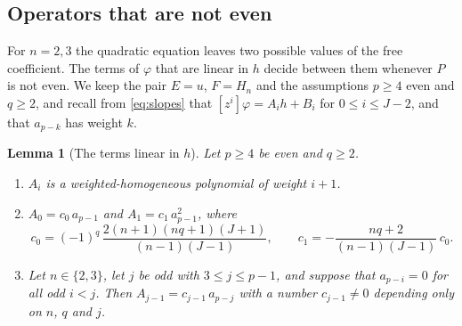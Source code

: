 \documentclass[11pt]{article}
\newtheorem{lemma}[theorem]{Lemma}
\theoremstyle{definition}
\theoremstyle{remark}
\numberwithin{equation}{section}
\begin{document}
\subsection{Operators that are not even}\label{sec:not-even}

For \(n=2,3\) the quadratic equation leaves two possible values of the
free coefficient. The terms of \(\varphi\) that are linear in \(h\)
decide between them whenever \(P\) is not even. We keep the pair
\(E=u\), \(F=H_n\) and the assumptions \(p\ge4\) even and \(q\ge2\), and
recall from \eqref{eq:slopes} that \([z^i]\varphi=A_ih+B_i\) for
\(0\le i\le J-2\), and that \(a_{p-k}\) has weight \(k\).

\begin{lemma}[The terms linear in \(h\)]\label{lem:slopes}
Let \(p\ge4\) be even and \(q\ge2\).
\begin{enumerate}[label=\textup{(\alph*)},leftmargin=2.2em]
\item \(A_i\) is a weighted-homogeneous polynomial of weight \(i+1\).
\item \(A_0=c_0\,a_{p-1}\) and \(A_1=c_1\,a_{p-1}^2\), where
\[
 c_0=(-1)^q\,\frac{2(n+1)(nq+1)(J+1)}{(n-1)(J-1)},\qquad
 c_1=-\frac{nq+2}{(n-1)(J-1)}\,c_0 .
\]
\item Let \(n\in\{2,3\}\), let \(j\) be odd with \(3\le j\le p-1\), and
suppose that \(a_{p-i}=0\) for all odd \(i<j\). Then
\(A_{j-1}=c_{j-1}\,a_{p-j}\) with a number \(c_{j-1}\ne0\) depending
only on \(n\), \(q\) and \(j\).
\end{enumerate}
\end{lemma}
\end{document}
